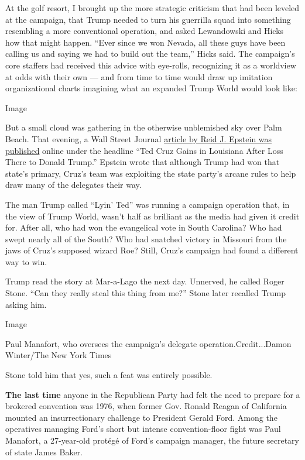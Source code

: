 At the golf resort, I brought up the more strategic criticism that had
been leveled at the campaign, that Trump needed to turn his guerrilla
squad into something resembling a more conventional operation, and asked
Lewandowski and Hicks how that might happen. ``Ever since we won Nevada,
all these guys have been calling us and saying we had to build out the
team,'' Hicks said. The campaign's core staffers had received this
advice with eye-rolls, recognizing it as a worldview at odds with their
own --- and from time to time would draw up imitation organizational
charts imagining what an expanded Trump World would look like:

Image

But a small cloud was gathering in the otherwise unblemished sky over
Palm Beach. That evening, a Wall Street Journal
\href{http://www.wsj.com/articles/ted-cruz-gains-in-louisiana-after-loss-there-to-donald-trump-1458861959}{article
by Reid J. Epstein was published} online under the headline ``Ted Cruz
Gains in Louisiana After Loss There to Donald Trump.'' Epstein wrote
that although Trump had won that state's primary, Cruz's team was
exploiting the state party's arcane rules to help draw many of the
delegates their way.

The man Trump called ``Lyin' Ted'' was running a campaign operation
that, in the view of Trump World, wasn't half as brilliant as the media
had given it credit for. After all, who had won the evangelical vote in
South Carolina? Who had swept nearly all of the South? Who had snatched
victory in Missouri from the jaws of Cruz's supposed wizard Roe? Still,
Cruz's campaign had found a different way to win.

Trump read the story at Mar-a-Lago the next day. Unnerved, he called
Roger Stone. ``Can they really steal this thing from me?'' Stone later
recalled Trump asking him.

Image

Paul Manafort, who oversees the campaign's delegate
operation.Credit...Damon Winter/The New York Times

Stone told him that yes, such a feat was entirely possible.

\textbf{The last time} anyone in the Republican Party had felt the need
to prepare for a brokered convention was 1976, when former Gov. Ronald
Reagan of California mounted an insurrectionary challenge to President
Gerald Ford. Among the operatives managing Ford's short but intense
convention-floor fight was Paul Manafort, a 27-year-old protégé of
Ford's campaign manager, the future secretary of state James Baker.

